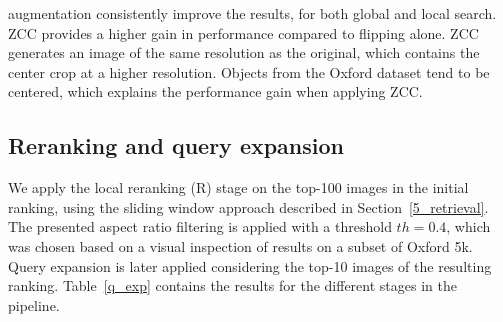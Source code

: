 \documentclass{sig-arxiv}
\begin{document}
augmentation consistently improve the results, for both global and local search. ZCC provides a higher gain in performance compared to flipping alone. ZCC generates an image of the same resolution as the original, which contains the center crop at a higher resolution. Objects from the Oxford dataset tend to be centered, which explains the performance gain when applying ZCC.\subsection{Reranking and query expansion}

We apply the local reranking (R) stage on the top-100 images in the initial ranking, using the sliding window approach described in Section~\ref{5_retrieval}. 
The presented aspect ratio filtering is applied with a threshold $th = 0.4$, which was chosen based on a visual inspection of results on a subset of Oxford 5k. 
Query expansion is later applied considering the top-10 images of the resulting ranking. 
Table~\ref{q_exp} contains the results for the different stages in the pipeline.
\end{document}
